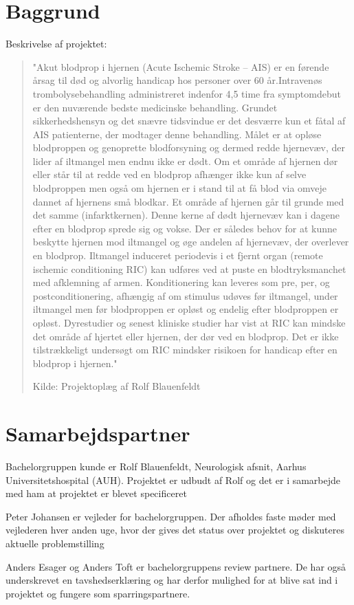 	\section{Baggrund}
	Beskrivelse af projektet: 
	\begin{quote}
			"Akut blodprop i hjernen (Acute Ischemic Stroke – AIS) er en førende årsag til død og alvorlig handicap hos personer over 60 år.Intravenøs trombolysebehandling administreret indenfor 4,5 time fra symptomdebut er den nuværende bedste medicinske behandling. Grundet sikkerhedshensyn og det snævre tidsvindue er det desværre kun et fåtal af AIS patienterne, der modtager denne behandling. Målet er at opløse blodproppen og genoprette blodforsyning og dermed redde hjernevæv, der lider af iltmangel men endnu ikke er dødt. Om et område af hjernen dør eller står til at redde ved en blodprop afhænger ikke kun af selve blodproppen men også om hjernen er i stand til at få blod via omveje dannet af hjernens små blodkar. Et område af hjernen går til grunde med det samme (infarktkernen). Denne kerne af dødt hjernevæv kan i dagene efter en blodprop sprede sig og vokse. Der er således behov for at kunne beskytte hjernen mod iltmangel og øge andelen af hjernevæv, der overlever en blodprop. Iltmangel induceret periodevis i et fjernt organ (remote ischemic conditioning RIC) kan udføres ved at puste en blodtryksmanchet med afklemning af armen. Konditionering kan leveres som pre, per, og postconditionering, afhængig af om stimulus udøves før iltmangel, under iltmangel men før blodproppen er opløst og endelig efter blodproppen er opløst. Dyrestudier og senest kliniske studier har vist at RIC kan mindske det område af hjertet eller hjernen, der dør ved en blodprop. Det er ikke tilstrækkeligt undersøgt om RIC mindsker risikoen for handicap efter en blodprop i hjernen."
			
			Kilde: Projektoplæg af Rolf Blauenfeldt
	\end{quote}

		
	\section{Samarbejdspartner}
	Bachelorgruppen kunde er Rolf Blauenfeldt, Neurologisk afsnit, Aarhus Universitetshospital (AUH). Projektet er udbudt af Rolf og det er i samarbejde med ham at projektet er blevet specificeret 
	
	Peter Johansen er vejleder for bachelorgruppen. Der afholdes faste møder med vejlederen hver anden uge, hvor der gives det status over projektet og diskuteres aktuelle problemstilling
	
	Anders Esager og Anders Toft er bachelorgruppens review partnere. De har også underskrevet en tavshedserklæring og har derfor mulighed for at blive sat ind i projektet og fungere som sparringspartnere. 
	
